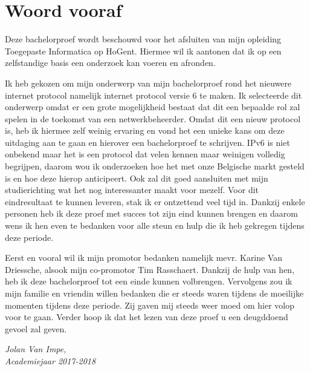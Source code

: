 
\chapter*{Woord vooraf}
\label{ch:voorwoord}

Deze bachelorproef wordt beschouwd voor het afsluiten van mijn opleiding Toegepaste Informatica op HoGent. Hiermee wil ik aantonen dat ik op een zelfstandige basis een onderzoek kan voeren en afronden.

Ik heb gekozen om mijn onderwerp van mijn bachelorproef rond het nieuwere internet protocol namelijk internet protocol versie 6 te maken. Ik selecteerde dit onderwerp omdat er een grote mogelijkheid bestaat dat dit een bepaalde rol zal spelen in de toekomst van een netwerkbeheerder. Omdat dit een nieuw protocol is, heb ik hiermee zelf weinig ervaring en vond het een unieke kans om deze uitdaging aan te gaan en hierover een bachelorproef te schrijven. IPv6 is niet onbekend maar het is een protocol dat velen kennen maar weinigen volledig begrijpen, daarom wou ik onderzoeken hoe het met onze Belgische markt gesteld is en hoe deze hierop anticipeert. Ook zal dit goed aansluiten met mijn studierichting wat het nog interessanter maakt voor mezelf.
Voor dit eindresultaat te kunnen leveren, stak ik er ontzettend veel tijd in. Dankzij enkele personen heb ik deze proef met succes tot zijn eind kunnen brengen en daarom wens ik hen even te bedanken voor alle steun en hulp die ik heb gekregen tijdens deze periode.

Eerst en vooral wil ik mijn promotor bedanken namelijk mevr. Karine Van Driessche, alsook mijn co-promotor Tim Rasschaert. Dankzij de hulp van hen, heb ik deze bachelorproef tot een einde kunnen volbrengen. Vervolgens zou ik mijn familie en vriendin willen bedanken die er steeds waren tijdens de moeilijke momenten tijdens deze periode. Zij gaven mij steeds weer moed om hier volop voor te gaan.
Verder hoop ik dat het lezen van deze proef u een deugddoend gevoel zal geven.
\begin{flushright}
\textit{Jolan Van Impe,} \\
\textit{Academiejaar 2017-2018}
\end{flushright}




